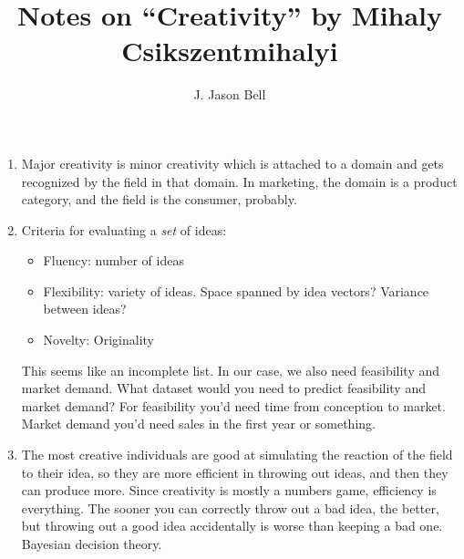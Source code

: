 \documentclass[11pt, oneside]{article}   	%
\title{Notes on ``Creativity'' by Mihaly Csikszentmihalyi}
\author{J. Jason Bell}
\date{}							%
\begin{document}
 \maketitle

\begin{enumerate}
\item Major creativity is minor creativity which is attached to a domain and gets recognized by the field in that domain.  In marketing, the domain is a product category, and the field is the consumer, probably.
\item Criteria for evaluating a \textit{set} of ideas:
	\begin{itemize}
	\item Fluency: number of ideas
	\item Flexibility: variety of ideas.  Space spanned by idea vectors?  Variance between ideas?
	\item Novelty: Originality
	\end{itemize}
	This seems like an incomplete list.  In our case, we also need feasibility and market demand.  What dataset would you need to predict feasibility and market demand?  For feasibility you'd need time from conception to market.  Market demand you'd need sales in the first year or something.
\item The most creative individuals are good at simulating the reaction of the field to their idea, so they are more efficient in throwing out ideas, and then they can produce more.  Since creativity is mostly a numbers game, efficiency is everything.  The sooner you can correctly throw out a bad idea, the better, but throwing out a good idea accidentally is worse than keeping a bad one.  Bayesian decision theory.  
	
\end{enumerate}
\end{document}
